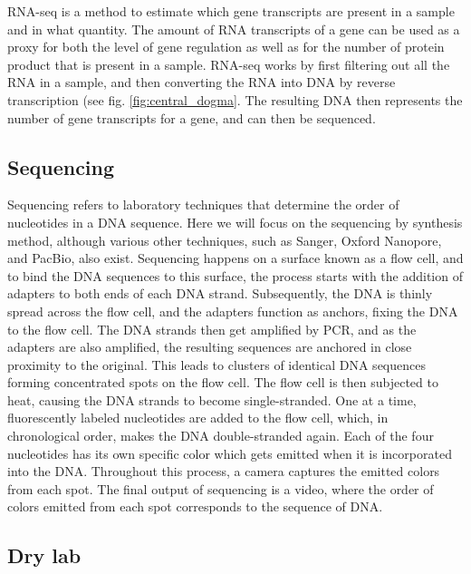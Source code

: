 RNA-seq is a method to estimate which gene transcripts are present in a sample and in what quantity\cite{Nagalakshmi2008}. The amount of RNA transcripts of a gene can be used as a proxy for both the level of gene regulation as well as for the number of protein product that is present in a sample. RNA-seq works by first filtering out all the RNA in a sample, and then converting the RNA into DNA by reverse transcription (see fig. \ref{fig:central_dogma}. The resulting DNA then represents the number of gene transcripts for a gene, and can then be sequenced.

\subsection{Sequencing}

Sequencing refers to laboratory techniques that determine the order of nucleotides in a DNA sequence. Here we will focus on the sequencing by synthesis method, although various other techniques, such as Sanger, Oxford Nanopore, and PacBio, also exist. Sequencing happens on a surface known as a flow cell, and to bind the DNA sequences to this surface, the process starts with the addition of adapters to both ends of each DNA strand. Subsequently, the DNA is thinly spread across the flow cell, and the adapters function as anchors, fixing the DNA to the flow cell. The DNA strands then get amplified by PCR, and as the adapters are also amplified, the resulting sequences are anchored in close proximity to the original. This leads to clusters of identical DNA sequences forming concentrated spots on the flow cell. The flow cell is then subjected to heat, causing the DNA strands to become single-stranded. One at a time, fluorescently labeled nucleotides are added to the flow cell, which, in chronological order, makes the DNA double-stranded again. Each of the four nucleotides has its own specific color which gets emitted when it is incorporated into the DNA. Throughout this process, a camera captures the emitted colors from each spot. The final output of sequencing is a video, where the order of colors emitted from each spot corresponds to the sequence of DNA.

\subsection{Dry lab}

